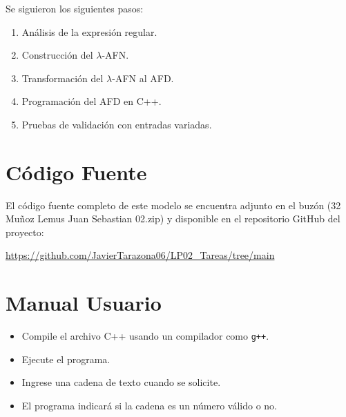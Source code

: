 \documentclass{article}
\begin{document}
Se siguieron los siguientes pasos:
\begin{enumerate}
    \item Análisis de la expresión regular.
    \item Construcción del $\lambda$-AFN.
    \item Transformación del $\lambda$-AFN al AFD.
    \item Programación del AFD en C++.
    \item Pruebas de validación con entradas variadas.
\end{enumerate}



\section{Código Fuente}\label{sec:cod}

El código fuente completo de este modelo se encuentra adjunto en el buzón 
(32 Muñoz Lemus Juan Sebastian 02.zip)
y disponible en el repositorio GitHub del proyecto:

\begin{center}
\url{https://github.com/JavierTarazona06/LP02_Tareas/tree/main}
\end{center}



\section{Manual Usuario}\label{sec:man_u}

\begin{itemize}
    \item Compile el archivo C++ usando un compilador como \texttt{g++}.
    \item Ejecute el programa.
    \item Ingrese una cadena de texto cuando se solicite.
    \item El programa indicará si la cadena es un número válido o no.
\end{itemize}
\end{document}

